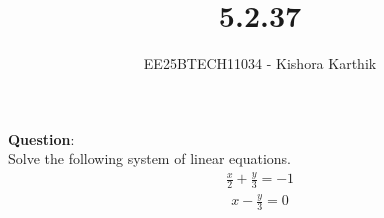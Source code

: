 \documentclass[journal]{IEEEtran}
\begin{document}

\vspace{3cm}

\title{5.2.37}
\author{EE25BTECH11034 - Kishora Karthik}
{\let\newpage\relax\maketitle}

\renewcommand{\thefigure}{\theenumi}
\renewcommand{\thetable}{\theenumi}
\setlength{\intextsep}{10pt} %
\textbf{Question}:\\
Solve the following system of linear equations.
\begin{align*}
    \frac{x}{2}+\frac{y}{3}=-1
\end{align*}
\begin{align*}
    x-\frac{y}{3}=0
\end{align*}
\bigskip
\end{document}
